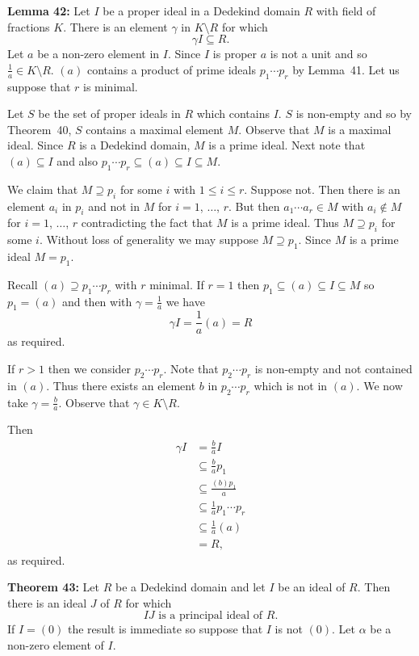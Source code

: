 \textbf{Lemma 42:} Let $I$ be a proper ideal in a Dedekind domain $R$ with field of fractions $K$.  There is an element $\gamma$ in $K\setminus R$ for which
\[ \gamma I \subseteq R . \]
\pf Let $a$ be a non-zero element in $I$.  Since $I$ is proper $a$ is not a unit and so $\frac{1}{a}\in K\setminus R$.
$(a)$ contains a product of prime ideals $p_1\dotsm p_r$ by Lemma~41.  Let us suppose that $r$ is minimal.

Let $S$ be the set of proper ideals in $R$ which contains $I$.  $S$ is non-empty and so by Theorem~40, $S$ contains a maximal element $M$.  Observe that $M$ is a maximal ideal.  Since $R$ is a Dedekind domain, $M$ is a prime ideal.  Next note that $(a)\subseteq I$ and also $p_1\dotsm p_r\subseteq(a)\subseteq I\subseteq M$.

We claim that $M\supseteq p_i$ for some $i$ with $1\leq i\leq r$.  Suppose not.  Then there is an element $a_i$ in $p_i$ and not in $M$ for $i=1$, $\dotsc$, $r$.  But then $a_1\dotsm a_r\in M$ with $a_i\notin M$ for $i=1$, $\dotsc$, $r$ contradicting the fact that $M$ is a prime ideal.  Thus $M\supseteq p_i$ for some $i$.
%
Without loss of generality we may suppose $M\supseteq p_1$.  Since $M$ is a prime ideal $M=p_1$.

Recall $(a)\supseteq p_1\dotsm p_r$ with $r$ minimal.  If $r=1$ then $p_1\subseteq(a)\subseteq I\subseteq M$ so $p_1=(a)$ and then with $\gamma=\frac{1}{a}$ we have
\[ \gamma I = \frac{1}{a}(a) = R \]
as required.

If $r>1$ then we consider $p_2\dotsm p_r$.  Note that $p_2\dotsm p_r$ is non-empty and not contained in $(a)$.  Thus there exists an element $b$ in $p_2\dotsm p_r$ which is not in $(a)$.  We now take $\gamma=\frac{b}{a}$.  Observe that $\gamma\in K\setminus R$.

Then
\begin{align*}
\gamma I &= \frac{b}{a} I \\
&\subseteq \frac{b}{a} p_1 \\
&\subseteq \frac{(b)p_1}{a} \\
&\subseteq \frac{1}{a}p_1\dotsm p_r \\
&\subseteq \frac{1}{a}(a) \\
&= R ,
\end{align*}
as required.

\textbf{Theorem 43:} Let $R$ be a Dedekind domain and let $I$ be an ideal of $R$.  Then there is an ideal $J$ of $R$ for which
\[ \text{$IJ$ is a principal ideal of $R$} . \]
\pf If $I=(0)$ the result is immediate so suppose that $I$ is not $(0)$.  Let $\alpha$ be a non-zero element of $I$.

